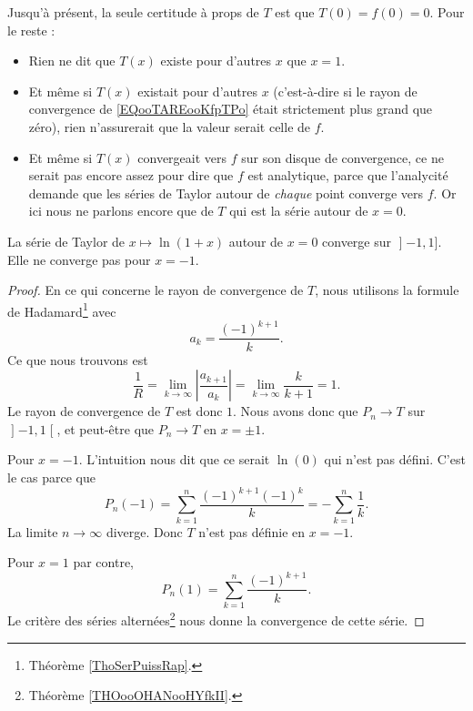 Jusqu'à présent, la seule certitude à props de \( T\) est que \( T(0)=f(0)=0\). Pour le reste :
\begin{itemize}
    \item Rien ne dit que \( T(x)\) existe pour d'autres \( x\) que \( x=1\).
    \item Et même si \( T(x)\) existait pour d'autres \( x\) (c'est-à-dire si le rayon de convergence de \eqref{EQooTAREooKfpTPo} était strictement plus grand que zéro), rien n'assurerait que la valeur serait celle de \( f\).
    \item Et même si \( T(x)\) convergeait vers \( f\) sur son disque de convergence, ce ne serait pas encore assez pour dire que \( f\) est analytique, parce que l'analycité demande que les séries de Taylor autour de \emph{chaque} point converge vers \( f\). Or ici nous ne parlons encore que de \( T\) qui est la série autour de \( x=0\).
\end{itemize}

\begin{lemma}       \label{LEMooWMGGooRpAxBa}
    La série de Taylor de \( x\mapsto \ln(1+x)\) autour de \( x=0\) converge sur \( \mathopen] -1 , 1 \mathclose]\). Elle ne converge pas pour \( x=-1\).
\end{lemma}

\begin{proof}
        
    En ce qui concerne le rayon de convergence de \( T\), nous utilisons la formule de Hadamard\footnote{Théorème \ref{ThoSerPuissRap}.} avec
    \begin{equation}
        a_k=\frac{ (-1)^{k+1} }{ k }.
    \end{equation}
    Ce que nous trouvons est
    \begin{equation}
        \frac{1}{ R }=\lim_{k\to \infty} | \frac{ a_{k+1} }{ a_k } |=\lim_{k\to \infty} \frac{ k }{ k+1 }=1.
    \end{equation}
    Le rayon de convergence de \( T\) est donc \( 1\). Nous avons donc que \( P_n\to T\) sur \( \mathopen] -1 , 1 \mathclose[\), et peut-être que \( P_n\to T\) en \( x=\pm 1\).

    Pour \( x=-1\). L'intuition nous dit que ce serait \( \ln(0)\) qui n'est pas défini. C'est le cas parce que 
    \begin{equation}
        P_n(-1)=\sum_{k=1}^n\frac{ (-1)^{k+1}(-1)^k }{ k }=-\sum_{k=1}^n\frac{1}{ k }.
    \end{equation}
    La limite \( n\to \infty\) diverge. Donc \( T\) n'est pas définie en \( x=-1\).

    Pour \( x=1\) par contre,
    \begin{equation}
        P_n(1)=\sum_{k=1}^n\frac{ (-1)^{k+1} }{ k }.
    \end{equation}
    Le critère des séries alternées\footnote{Théorème \ref{THOooOHANooHYfkII}.} nous donne la convergence de cette série.
\end{proof}

